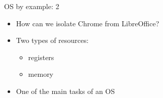 \documentclass{beamer}
\begin{document}
\begin{frame}{OS by example: 2}
  \begin{itemize}
    \item How can we isolate Chrome from LibreOffice?
    \item<2-> Two types of resources:
      \begin{itemize}
        \item registers 
        \item memory 
      \end{itemize}
    \item <3-> One of the main tasks of an OS
  \end{itemize}
\end{frame}
\end{document}
